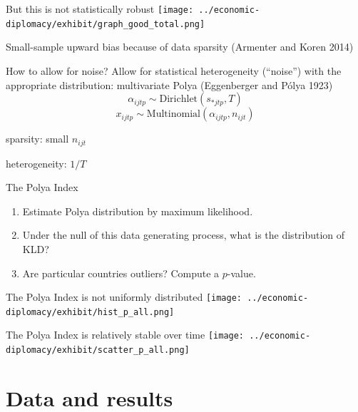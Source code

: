 \documentclass[
  ignorenonframetext,
  aspectratio=16,
]{beamer}
\providecommand{\tightlist}{%
  \setlength{\itemsep}{0pt}\setlength{\parskip}{0pt}}
\begin{document}
\begin{frame}{But this is not statistically robust}
\protect\hypertarget{but-this-is-not-statistically-robust}{}
\texttt{[image: ../economic-diplomacy/exhibit/graph\_good\_total.png]}

Small-sample upward bias because of data sparsity (Armenter and Koren
2014)
\end{frame}

\begin{frame}{How to allow for noise?}
\protect\hypertarget{how-to-allow-for-noise}{}
Allow for statistical heterogeneity (``noise'') with the appropriate
distribution: multivariate Polya (Eggenberger and Pólya 1923) \[
\alpha_{ijtp} \sim \text{Dirichlet}(s_{*jtp}, T)
\] \[
x_{ijtp} \sim \text{Multinomial}(\alpha_{ijtp}, n_{ijt})
\]

sparsity: small \(n_{ijt}\)

heterogeneity: \(1/T\)
\end{frame}

\begin{frame}{The Polya Index}
\protect\hypertarget{the-polya-index}{}
\begin{enumerate}
\tightlist
\item
  Estimate Polya distribution by maximum likelihood.
\item
  Under the null of this data generating process, what is the
  distribution of KLD?
\item
  Are particular countries outliers? Compute a \(p\)-value.
\end{enumerate}
\end{frame}

\begin{frame}{The Polya Index is not uniformly distributed}
\protect\hypertarget{the-polya-index-is-not-uniformly-distributed}{}
\texttt{[image: ../economic-diplomacy/exhibit/hist\_p\_all.png]}
\end{frame}

\begin{frame}{The Polya Index is relatively stable over time}
\protect\hypertarget{the-polya-index-is-relatively-stable-over-time}{}
\texttt{[image: ../economic-diplomacy/exhibit/scatter\_p\_all.png]}
\end{frame}

\hypertarget{data-and-results}{%
\section{Data and results}\label{data-and-results}}
\end{document}
